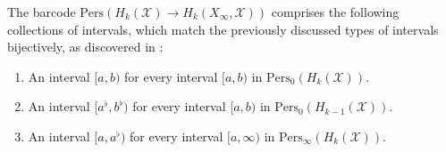 \begin{corollary}
The barcode $\mathrm{Pers}(H_{k}(\mathcal{X}) \rightarrow H_{k}(X_{\infty}, \mathcal{X}))$ comprises the following collections of intervals, which match the previously discussed types of intervals bijectively, as discovered in \cite[Proposition 2.5]{de2011dualities}:
\begin{enumerate}
    \item An interval $[a, b)$ for every interval $[a, b)$ in $\mathrm{Pers}_{0}(H_{k}(\mathcal{X}))$.
    \item An interval $[a^{\flat}, b^{\flat})$ for every interval $[a, b)$ in $\mathrm{Pers}_{0}(H_{k-1}(\mathcal{X}))$.
    \item An interval $[a, a^{\flat})$ for every interval $[a, \infty)$ in $\mathrm{Pers}_{\infty}(H_{k}(\mathcal{X}))$.
\end{enumerate}
\end{corollary}

